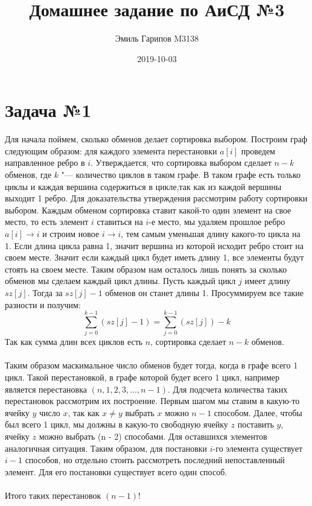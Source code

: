 \documentclass{article}
\title{Домашнее задание по АиСД №3}
\date{2019-10-03}
\author{Эмиль Гарипов M3138}
\begin{document}

\maketitle
\newpage
{}

\section*{Задача №1}
Для начала поймем, сколько обменов делает сортировка выбором. Построим граф следующим образом: для каждого элемента перестановки $a[i]$ проведем направленное ребро в $i$. Утверждается, что сортировка выбором сделает $n - k$ обменов, где $k$ "--- количество циклов в таком графе. В таком графе есть только циклы и каждая вершина содержиться в цикле,так как из каждой вершины выходит 1 ребро.  Для доказательства утверждения рассмотрим работу сортировки выбором. Каждым обменом сортировка ставит какой-то один элемент на свое место, то есть элемент $i$ ставиться на $i$-е место, мы удаляем прошлое ребро $a[i] \rightarrow i$ и строим новое $i \rightarrow i$, тем самым уменьшая длину какого-то цикла на 1. Если длина цикла равна 1, значит вершина из которой исходит ребро стоит на своем месте. Значит если каждый цикл будет иметь длину 1, все элементы будут стоять на своем месте. Таким образом нам осталось лишь понять за сколько обменов мы сделаем каждый цикл длины. Пусть каждый цикл $j$ имеет длину  $sz[j]$. Тогда за $sz[j] - 1$ обменов он станет длины 1. Просуммируем все такие разности и получим: $$\sum\limits_{j = 0}^{k - 1}(sz[j] - 1) = \sum\limits_{j = 0}^{k - 1}(sz[j]) - k$$ Так как сумма длин всех циклов есть $n$, сортировка сделает $n - k$ обменов. 
\\\\
Таким образом маскимальное число обменов будет тогда, когда в графе всего 1 цикл. Такой перестановкой, в графе которой будет всего 1 цикл, например является перестановка $(n, 1, 2, 3, \dots, n - 1)$. Для подсчета количества таких перестановок рассмотрим их построение. Первым шагом мы ставим в какую-то ячейку $y$ число $x$, так как $x \neq y$ выбрать $x$ можно $n - 1$ способом. Далее, чтобы был всего 1 цикл, мы должны в какую-то свободную ячейку $z$ поставить $y$, ячейку $z$ можно выбрать (n - 2) способами. Для оставшихся элементов аналогичная ситуация. Таким образом, для постановки $i$-го элемента существует $i - 1$ способов, но отдельно стоить рассмотреть последний непоставленный элемент. Для его постановки существует всего один способ.
\\\\
Итого таких перестановок $(n - 1)!$ 
\end{document}
